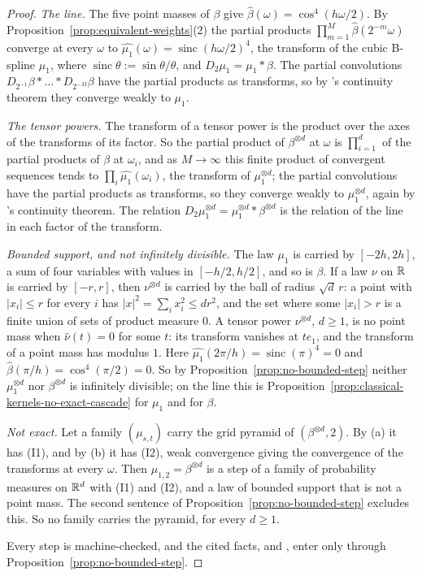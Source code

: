 \begin{proof}
\emph{The line.} The five point masses of $\beta$ give $\widehat{\beta}(\omega) = \cos^4(h\omega/2)$.
By Proposition~\ref{prop:equivalent-weights}(2) the partial products
$\prod_{m=1}^M\widehat{\beta}(2^{-m}\omega)$ converge at every $\omega$ to
$\widehat{\mu_1}(\omega) = \operatorname{sinc}(h\omega/2)^4$, the transform of the cubic B-spline
$\mu_1$, where $\operatorname{sinc}\theta := \sin\theta/\theta$, and $D_2\mu_1 = \mu_1 * \beta$. The
partial convolutions $D_{2^{-1}}\beta * \dots * D_{2^{-M}}\beta$ have the partial products as
transforms, so by \Levy's continuity theorem they converge weakly to $\mu_1$.

\emph{The tensor powers.} The transform of a tensor power is the product over the axes of the
transforms of its factor. So the partial product of $\beta^{\otimes d}$ at $\omega$ is
$\prod_{i=1}^d$ of the partial products of $\beta$ at $\omega_i$, and as $M \to \infty$ this finite
product of convergent sequences tends to $\prod_i\widehat{\mu_1}(\omega_i)$, the transform of
$\mu_1^{\otimes d}$; the partial convolutions have the partial products as transforms, so they
converge weakly to $\mu_1^{\otimes d}$, again by \Levy's continuity theorem. The relation
$D_2\mu_1^{\otimes d} = \mu_1^{\otimes d} * \beta^{\otimes d}$ is the relation of the line in each
factor of the transform.

\emph{Bounded support, and not infinitely divisible.} The law $\mu_1$ is carried by $[-2h, 2h]$, a
sum of four variables with values in $[-h/2, h/2]$, and so is $\beta$. If a law $\nu$ on $\mathbb{R}$ is
carried by $[-r, r]$, then $\nu^{\otimes d}$ is carried by the ball of radius $\sqrt d\,r$: a point
with $|x_i| \le r$ for every $i$ has $|x|^2 = \sum_ix_i^2 \le dr^2$, and the set where some
$|x_i| > r$ is a finite union of sets of product measure $0$. A tensor power $\nu^{\otimes d}$,
$d \ge 1$, is no point mass when $\widehat\nu(t) = 0$ for some $t$: its transform vanishes at
$te_1$, and the transform of a point mass has modulus $1$. Here $\widehat{\mu_1}(2\pi/h) =
\operatorname{sinc}(\pi)^4 = 0$ and $\widehat{\beta}(\pi/h) = \cos^4(\pi/2) = 0$. So by
Proposition~\ref{prop:no-bounded-step} neither $\mu_1^{\otimes d}$ nor $\beta^{\otimes d}$ is
infinitely divisible; on the line this is Proposition~\ref{prop:classical-kernels-no-exact-cascade}
for $\mu_1$ and for $\beta$.

\emph{Not exact.} Let a family $(\mu_{s,t})$ carry the grid pyramid of $(\beta^{\otimes d}, 2)$.
By (a) it has (I1), and by (b) it has (I2), weak convergence giving the convergence of the
transforms at every $\omega$. Then $\mu_{1,2} = \beta^{\otimes d}$ is a step of a family of
probability measures on $\mathbb{R}^d$ with (I1) and (I2), and a law of bounded support that is not a
point mass. The second sentence of Proposition~\ref{prop:no-bounded-step} excludes this. So no family
carries the pyramid, for every $d \ge 1$.

Every step is machine-checked, and the cited facts,  and , enter only
through Proposition~\ref{prop:no-bounded-step}.
\end{proof}

